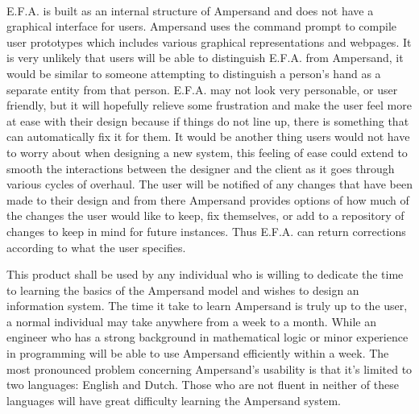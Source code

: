 \documentclass[12pt]{report}
\begin{document}
\paragraph*{}
E.F.A. is built as an internal structure of Ampersand and does not have a graphical interface for 
users. Ampersand uses the command prompt to compile user prototypes which includes various 
graphical representations and webpages. It is very unlikely that users will be able to distinguish 
E.F.A. from Ampersand, it would be similar to someone attempting to distinguish a person’s hand as 
a separate entity from that person. E.F.A. may not look very personable, or user friendly, but it 
will hopefully relieve some frustration and make the user feel more at ease with their design 
because if things do not line up, there is something that can automatically fix it for them. It 
would be another thing users would not have to worry about when designing a new system, this 
feeling of ease could extend to smooth the interactions between the designer and the client as it 
goes through various cycles of overhaul. The user will be notified of any changes that have been 
made to their design and from there Ampersand provides options of how much of the changes the user 
would like to keep, fix themselves, or add to a repository of changes to keep in mind for future 
instances. Thus E.F.A. can return corrections according to what the user specifies.

This product shall be used by any individual who is willing to dedicate the time to learning the 
basics of the Ampersand model and wishes to design an information system. The time it take to learn 
Ampersand is truly up to the user, a normal individual may take anywhere from a week to a month. 
While an engineer who has a strong background in mathematical logic or minor experience in 
programming will be able to use Ampersand efficiently within a week. The most pronounced problem 
concerning Ampersand’s usability is that it’s limited to two languages: English and Dutch. Those 
who are not fluent in neither of these languages will have great difficulty learning the Ampersand 
system.
\end{document}
